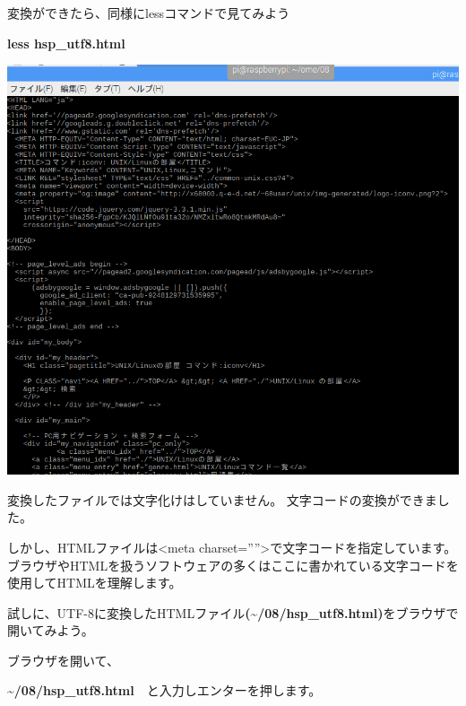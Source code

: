 \clearpage

変換ができたら、同様にlessコマンドで見てみよう

\textbf{less hsp\_utf8.html}



\begin{center}
\includegraphics[width=\textwidth]{./text08-img/textbook-img023.png}

\end{center}
変換したファイルでは文字化けはしていません。
文字コードの変換ができました。

\clearpage
しかし、HTMLファイルは{\textless}meta
charset=””{\textgreater}で文字コードを指定しています。
ブラウザやHTMLを扱うソフトウェアの多くはここに書かれている文字コードを使用してHTMLを理解します。

試しに、UTF-8に変換したHTMLファイル\textbf{({\textasciitilde}/08/hsp\_utf8.html)}をブラウザで開いてみよう。

ブラウザを開いて、

\textbf{{\textasciitilde}/08/hsp\_utf8.html}　と入力しエンターを押します。

